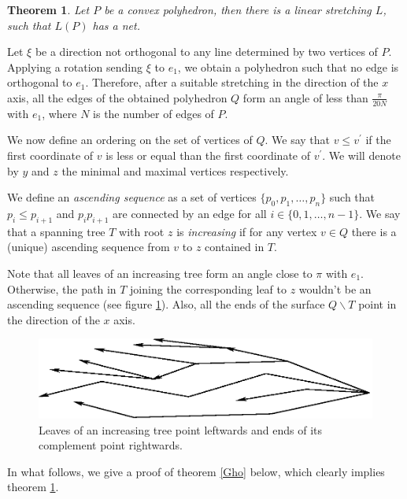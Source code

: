 \documentclass[openright, 12pt]{article}
\newtheorem{teorema}{Theorem}
\begin{document}
\begin{teorema}\label{Str}
{\rm Let $P$ be a convex polyhedron, then there is a linear stretching $L$, such that $L(P)$ has a net.}
\end{teorema}



Let $\xi $ be a direction not orthogonal to any line determined by two vertices of $P$. Applying a rotation sending $\xi $ to $e_1 $, we obtain a polyhedron such that no edge is orthogonal to $e_1$. Therefore, after a suitable stretching in the direction of the $x$ axis, all the edges of the obtained polyhedron $Q$  form an angle of less than $\frac{\pi}{20 N}$ with $e_1$, where $N$ is the number of edges of $P$.


We now define an ordering on the set of vertices of $Q$. We say that $v \leq v^{\prime}$ if the first coordinate of $v$ is less or equal than the first coordinate of $v^{\prime}$. We will denote by $y$ and $z$ the minimal and maximal vertices respectively.

We define an \textit{ascending sequence} as a set of vertices $\{ p_0, p_1, \ldots , p_n   \}$ such that $p_i \leq p_{i+1}$ and $p_i p_{i+1}$ are connected by an edge for all $i \in \{ 0,1, \ldots, n-1 \} $. We say that a spanning tree $T$ with root $z$ is \textit{increasing} if for any vertex $v\in Q$ there is a (unique) ascending sequence from $v$ to $z$ contained in $T$. 

Note that all leaves of an increasing tree form an angle close to $\pi$ with $e_1$. Otherwise, the path in $T$ joining the corresponding leaf to $z$ wouldn't be an ascending sequence (see figure \ref{Mon}). Also, all the ends of the surface $Q \backslash T$ point in the direction of the $x$ axis.




\begin{figure}[h]
\centering
\includegraphics[scale=0.84]{Mono2.eps}
\caption{Leaves of an increasing tree point leftwards and ends of its complement point rightwards.}\label{Mon}
\end{figure}



In what follows, we give a proof of theorem \ref{Gho} below, which clearly implies theorem \ref{Str}. 
\end{document}
